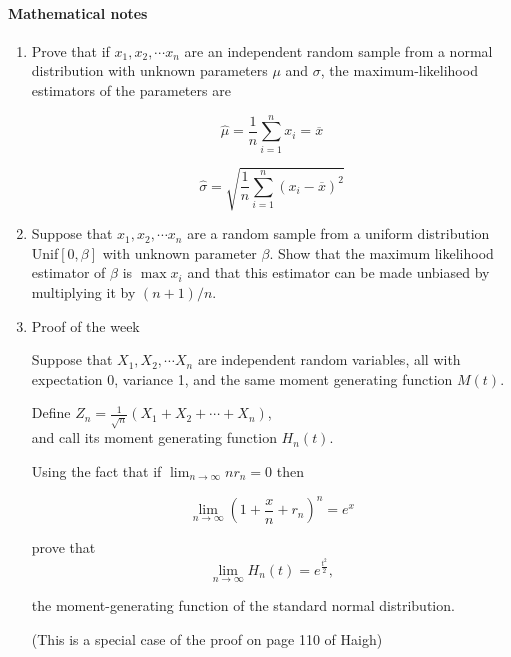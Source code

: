 \documentclass[12pt]{article}
\begin{document}
\pagebreak





\paragraph*{Mathematical notes}



\begin{enumerate}

\item Prove that if $x_1, x_2, \cdots x_n$ are an independent random sample from a normal distribution with unknown parameters $\mu$ and $\sigma$, the maximum-likelihood estimators of the parameters are

$$\hat{\mu} = \frac{1}{n} \sum_{i=1}^n x_i = \overline{x} $$

$$\hat{\sigma} =\sqrt{ \frac{1}{n} \sum_{i=1}^n (x_i - \overline{x})^2} $$



\pagebreak

\item Suppose that $x_1, x_2, \cdots x_n$ are a random sample from a uniform distribution Unif$[0,\beta]$ with unknown parameter $\beta$. Show that the maximum likelihood estimator of $\beta$ is $\max{x_i}$ and that this estimator can be made unbiased by multiplying it by $(n+1)/n$.

\pagebreak


\item Proof of the week

Suppose that $X_1, X_2, \cdots X_n$ are independent random variables, all with expectation 0, variance 1, and the same moment generating function $M(t).$

Define $Z_n = \frac{1}{\sqrt{n}}(X_1 + X_2 + \cdots + X_n)$,\\ and call its moment generating function $H_n(t).$

Using the fact that if
$\lim_{n \rightarrow \infty}nr_{n} = 0$ then

$$\lim_{n \rightarrow \infty}(1  + \frac{x}{n} + r_n)^n = e^x$$

prove that 
$$\lim_{n \rightarrow \infty} H_n(t) = e^{\frac{t^2}{2}},$$

the moment-generating function of the standard normal distribution.

(This is a special case of the proof on page 110 of Haigh)

\pagebreak


\end{enumerate}
\end{document}
